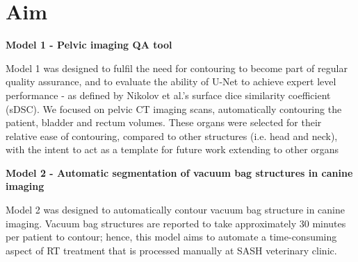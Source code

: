 \section{Aim}


\textbf{Model 1 - Pelvic imaging QA tool}

Model 1 was designed to fulfil the need for contouring to become part of regular quality assurance, and to evaluate the ability of U-Net to achieve expert level performance - as defined by Nikolov et al.'s surface dice similarity coefficient (sDSC). We focused on pelvic CT imaging scans, automatically contouring the patient, bladder and rectum volumes. These organs were selected for their relative ease of contouring, compared to other structures (i.e. head and neck), with the intent to act as a template for future work extending to other organs


\textbf{Model 2 - Automatic segmentation of vacuum bag structures in canine imaging}

Model 2 was designed to automatically contour vacuum bag structure in canine imaging. Vacuum bag structures are reported to take approximately 30 minutes per patient to contour; hence, this model aims to automate a time-consuming aspect of RT treatment that is processed manually at SASH veterinary clinic.


